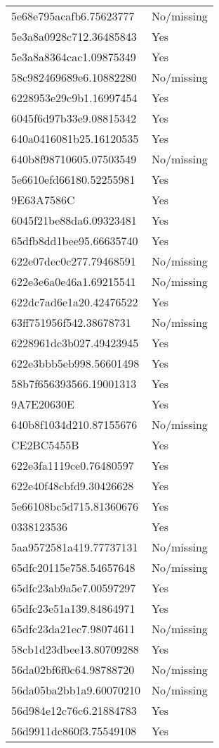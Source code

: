 \begin{tabular}{ll}
5e68e795acafb6.75623777 & No/missing \\
5e3a8a0928c712.36485843 & Yes \\
5e3a8a8364cac1.09875349 & Yes \\
58c982469689e6.10882280 & No/missing \\
6228953e29c9b1.16997454 & Yes \\
6045f6d97b33e9.08815342 & Yes \\
640a0416081b25.16120535 & Yes \\
640b8f98710605.07503549 & No/missing \\
5e6610efd66180.52255981 & Yes \\
9E63A7586C & Yes \\
6045f21be88da6.09323481 & Yes \\
65dfb8dd1bee95.66635740 & Yes \\
622e07dec0c277.79468591 & No/missing \\
622e3e6a0e46a1.69215541 & No/missing \\
622dc7ad6e1a20.42476522 & Yes \\
63ff751956f542.38678731 & No/missing \\
6228961dc3b027.49423945 & Yes \\
622e3bbb5eb998.56601498 & Yes \\
58b7f656393566.19001313 & Yes \\
9A7E20630E & Yes \\
640b8f1034d210.87155676 & No/missing \\
CE2BC5455B & Yes \\
622e3fa1119ce0.76480597 & Yes \\
622e40f48cbfd9.30426628 & Yes \\
5e66108bc5d715.81360676 & Yes \\
0338123536 & Yes \\
5aa9572581a419.77737131 & No/missing \\
65dfc20115e758.54657648 & No/missing \\
65dfc23ab9a5e7.00597297 & Yes \\
65dfc23e51a139.84864971 & Yes \\
65dfc23da21ec7.98074611 & No/missing \\
58cb1d23dbee13.80709288 & Yes \\
56da02bf6f0c64.98788720 & No/missing \\
56da05ba2bb1a9.60070210 & No/missing \\
56d984e12c76c6.21884783 & Yes \\
56d9911dc860f3.75549108 & Yes \\

\end{tabular}

